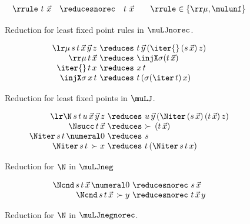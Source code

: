 \begin{figure}
    \centering
    \[
\begin{array}{rcl}
 \rrule \ t \ \vec x &\reducesnorec&  t \ \vec x \qquad  \rrule\in \{\rr \mu, \mulunf \} 
\end{array}
\]
    \caption{Reduction for least fixed point rules in $\muLJnorec$. }
    \label{fig:reduction-mu-norec}
\end{figure}

\begin{figure}
    \[
    \begin{array}{r@{\ \reduces\ }l}
         \lr \mu \, s \, t\, \vec x\, \vec y\, z & t\, \vec y\, (\iter{}\, (s\, \vec x)\, z) \\
         \rr \mu\, t\, \vec x & \injX\sigma (t\, \vec x) \\
         \iter{}\, t\, x & x\, t \\
         \injX \sigma\,  x\, t & t\, (\sigma(\iter\, t)\, x)
    \end{array}
    \]
    \caption{Reduction for least fixed points in $\muLJ$.}
    \label{fig:reduction-mu-iter}
\end{figure}


\begin{figure}
  \[
   \begin{array}{r@{\ \reduces\ }l}
         \lr \N\, s\, t\, u\, \vec x\, \vec y\, z & u\, \vec y\, (\Niter\, (s\, \vec x)\, (t\, \vec x)\, z) \\
        { \Nsucc \, t \, \vec x  }&{ \succ \, (t\, \vec x) } \\
         \Niter\, s\, t\, \numeral 0 & s \\
         \Niter\, s\, t\, \succ x & t\, (\Niter \, s\, t\, x)
    \end{array}
  \]
    \caption{Reduction for $\N$ in $\muLJneg$}
    \label{fig:reduction-N-muLJ}
\end{figure}


\begin{figure}
   \[
   \begin{array}{r@{\ \reducesnorec\ }l}
        \Ncnd \, s\, t\, \vec x\, \numeral 0 & s\, \vec x \\
        \Ncnd \, s\, t\, \vec x\, \succ y & t\, \vec x\, y
   \end{array}
   \]
    \caption{Reduction for $\N$ in $\muLJnegnorec$.}
    \label{fig:reduction-N-muLJnorec}
\end{figure}



